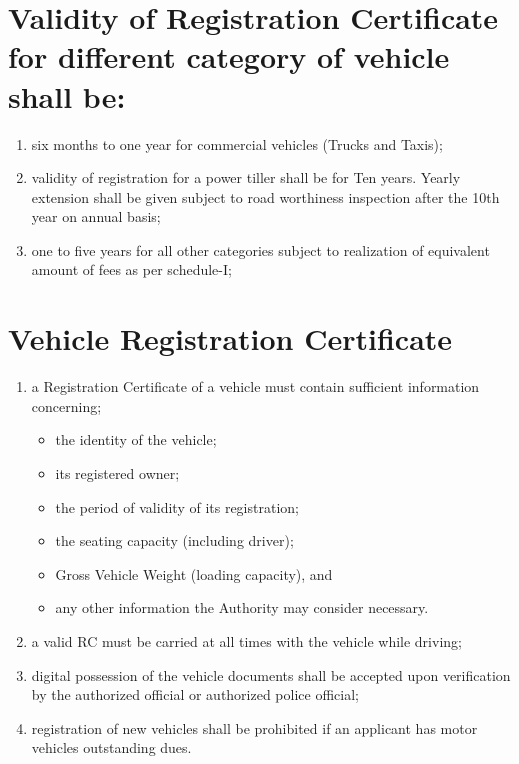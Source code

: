 \documentclass[
]{book}
\providecommand{\tightlist}{%
  \setlength{\itemsep}{0pt}\setlength{\parskip}{0pt}}
\begin{document}
\hypertarget{validity-of-registration-certificate-for-different-category-of-vehicle-shall-be}{%
\section{Validity of Registration Certificate for different category of vehicle shall be:}\label{validity-of-registration-certificate-for-different-category-of-vehicle-shall-be}}

\begin{enumerate}
\def\labelenumi{\alph{enumi}.}
\tightlist
\item
  six months to one year for commercial vehicles (Trucks and Taxis);
\item
  validity of registration for a power tiller shall be for Ten years. Yearly extension shall be given subject to road worthiness inspection after the 10th year on annual basis;
\item
  one to five years for all other categories subject to realization of equivalent amount of fees as per schedule-I;
\end{enumerate}

\hypertarget{vehicle-registration-certificate}{%
\section{Vehicle Registration Certificate}\label{vehicle-registration-certificate}}

\begin{enumerate}
\def\labelenumi{\alph{enumi}.}
\item
  a Registration Certificate of a vehicle must contain sufficient information concerning;

  \begin{itemize}
  \tightlist
  \item
    the identity of the vehicle;
  \item
    its registered owner;
  \item
    the period of validity of its registration;
  \item
    the seating capacity (including driver);
  \item
    Gross Vehicle Weight (loading capacity), and
  \item
    any other information the Authority may consider necessary.
  \end{itemize}
\item
  a valid RC must be carried at all times with the vehicle while driving;
\item
  digital possession of the vehicle documents shall be accepted upon verification by the authorized official or authorized police official;
\item
  registration of new vehicles shall be prohibited if an applicant has motor vehicles outstanding dues.
\end{enumerate}
\end{document}
